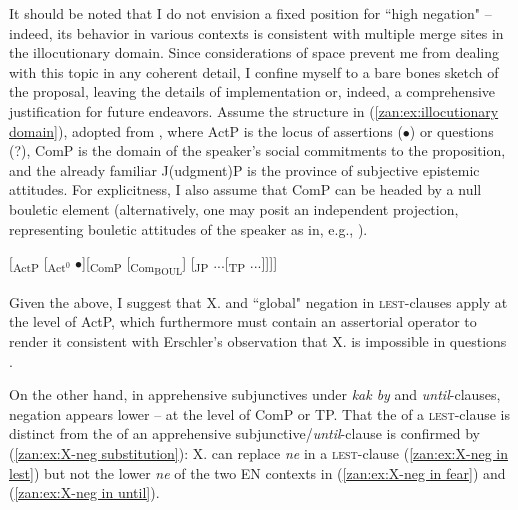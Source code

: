 \documentclass[output=paper,colorlinks,citecolor=brown]{langscibook}
\begin{document}
It should be noted that I do not envision a fixed position for ``high negation" -- indeed, its behavior in various contexts is consistent with multiple merge sites in the illocutionary domain. Since considerations of space prevent me from dealing with this topic in any coherent detail, I confine myself to a bare bones sketch of the proposal, leaving the details of implementation or, indeed, a comprehensive justification for future endeavors. Assume the structure in (\ref{zan:ex:illocutionary domain}), adopted from \citet{krifka2019layers}, where ActP is the locus of assertions ($\bullet$) or questions (?), ComP is the domain of the speaker's social commitments to the proposition, and the already familiar J(udgment)P is the province of subjective epistemic attitudes. For explicitness, I also assume that ComP can be headed by a null bouletic element (alternatively, one may posit an independent projection, representing bouletic attitudes of the speaker as in, e.g., \citealt{sode2018verb}).  

\ea \label{zan:ex:illocutionary domain}

$[$\textsubscript{ActP}  [\textsubscript{Act$^0$} $\bullet$][\textsubscript{ComP} [\textsubscript{Com\textsubscript{BOUL}}] [\textsubscript{JP} ...[\textsubscript{TP} ...]]]]
\z

\noindent  Given the above, I suggest that X.{\NEG} and ``global" negation in \textsc{lest}-clauses apply at the level of ActP, which furthermore must contain an assertorial operator to render it consistent with Erschler's observation that X.{\NEG} is impossible in questions .

\z

\noindent On the other hand, in apprehensive subjunctives under \textit{kak by} and \textit{until}-clauses, negation appears lower -- at the level of ComP or TP. That the {\NEG} of a \textsc{lest}-clause is distinct from the {\NEG} of an apprehensive subjunctive/\textit{until}-clause is confirmed by (\ref{zan:ex:X-neg substitution}):  X.{\NEG} can replace \textit{ne} in a \textsc{lest}-clause (\ref{zan:ex:X-neg in lest}) but not the lower \textit{ne} of the two EN contexts in (\ref{zan:ex:X-neg in fear}) and (\ref{zan:ex:X-neg in until}).

\ea \label{zan:ex:X-neg substitution}
\end{document}
